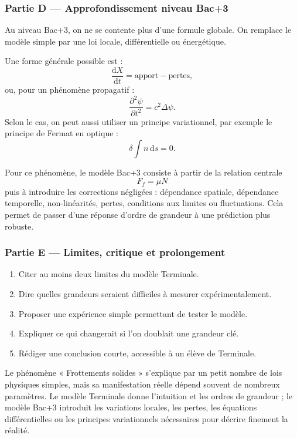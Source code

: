 \documentclass[11pt,a4paper]{article}
\begin{document}
\subsubsection*{Partie D — Approfondissement niveau Bac+3}

\begin{approfondissementbox}
Au niveau Bac+3, on ne se contente plus d'une formule globale. On remplace le modèle simple par une loi locale, différentielle ou énergétique.

Une forme générale possible est :
\[
\frac{\mathrm d X}{\mathrm dt}=\text{apport}-\text{pertes},
\]
ou, pour un phénomène propagatif :
\[
\frac{\partial^2 \psi}{\partial t^2}=c^2\Delta\psi.
\]
Selon le cas, on peut aussi utiliser un principe variationnel, par exemple le principe de Fermat en optique :
\[
\delta \int n\,\mathrm ds=0.
\]

Pour ce phénomène, le modèle Bac+3 consiste à partir de la relation centrale
\[
F_f=\mu N
\]
puis à introduire les corrections négligées : dépendance spatiale, dépendance temporelle, non-linéarités, pertes, conditions aux limites ou fluctuations. Cela permet de passer d'une réponse d'ordre de grandeur à une prédiction plus robuste.
\end{approfondissementbox}

\subsubsection*{Partie E — Limites, critique et prolongement}

\begin{enumerate}
  \item Citer au moins deux limites du modèle Terminale.
  \item Dire quelles grandeurs seraient difficiles à mesurer expérimentalement.
  \item Proposer une expérience simple permettant de tester le modèle.
  \item Expliquer ce qui changerait si l'on doublait une grandeur clé.
  \item Rédiger une conclusion courte, accessible à un élève de Terminale.
\end{enumerate}

\begin{corrigebox}
Le phénomène « Frottements solides » s'explique par un petit nombre de lois physiques simples, mais sa manifestation réelle dépend souvent de nombreux paramètres. Le modèle Terminale donne l'intuition et les ordres de grandeur ; le modèle Bac+3 introduit les variations locales, les pertes, les équations différentielles ou les principes variationnels nécessaires pour décrire finement la réalité.
\end{corrigebox}
\end{document}
